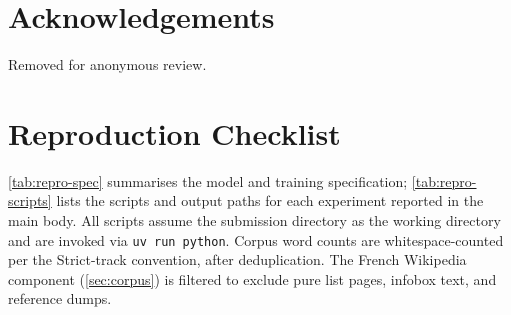 \documentclass[11pt]{article}
\begin{document}
\section*{Acknowledgements}
Removed for anonymous review.



\appendix

\section{Reproduction Checklist}
\label{app:reproduction}

\autoref{tab:repro-spec} summarises the model and training specification; \autoref{tab:repro-scripts} lists the scripts and output paths for each experiment reported in the main body. All scripts assume the submission directory as the working directory and are invoked via \texttt{uv run python}. Corpus word counts are whitespace-counted per the Strict-track convention, after deduplication.
The French Wikipedia component (\autoref{sec:corpus}) is filtered to exclude pure list pages, infobox text, and reference dumps.

\begin{table}[h]
\centering
{}
\caption{Model and training specification.}
\label{tab:repro-spec}
\end{table}
\end{document}
